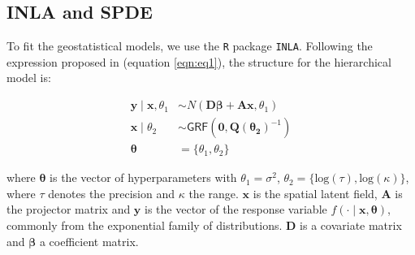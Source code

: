 \documentclass{article}
\begin{document}
\subsection{INLA and SPDE}

To fit the geostatistical models, we use the \texttt{R} package \texttt{INLA}. Following the expression proposed in (equation \ref{eqn:eq1}), the structure for the hierarchical model is: %



\begin{align}
\mathbf{y} \mid \mathbf{x}, \theta_{1} & \sim N(\boldsymbol{D\beta} + \mathbf{A} \mathbf{x}, \theta_{1}) \label{eqn:eq3}\\
\mathbf{x} \mid \theta_{2} & \sim \mathsf{GRF}(\boldsymbol{0}, \boldsymbol{Q(\theta_{2})}^{-1}) \label{eqn:eq4}\\
\boldsymbol{\theta} & = \{\theta_{1}, \theta_{2}\}\label{eqn:eq5}
\end{align}

where $\boldsymbol{\theta}$ is the vector of hyperparameters with $\theta_{1} = \sigma^{2}$, $\theta_{2} = \{\text{log}(\tau), \text{log}(\kappa)\}$, where $\tau$ denotes the precision and $\kappa$ the range.  $\boldsymbol{x}$ is the spatial latent field, $\boldsymbol{A}$ is the projector matrix and $\boldsymbol{y}$ is the vector of the response variable $f(\cdot \mid \boldsymbol{x}, \boldsymbol{\theta})$, commonly from the exponential family of distributions. $\boldsymbol{D}$ is a covariate matrix and $\boldsymbol{\beta}$ a coefficient matrix. 
\end{document}

